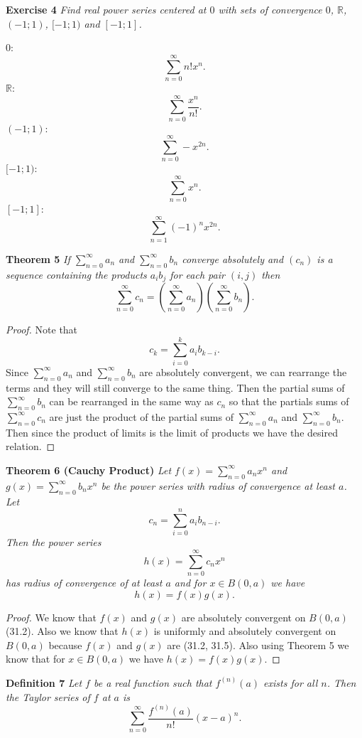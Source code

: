 \documentclass{article}
\begin{document}
\begin{flushleft}
\textbf{Exercise 4}
\textsl{Find real power series centered at $0$ with sets of convergence $0$, $\mathbb{R}$, $(-1;1)$, $[-1;1)$ and $[-1;1]$.}\newline

$0$:
\[
\sum_{n=0}^{\infty} n! x^n.
\]
$\mathbb{R}$:
\[
\sum_{n=0}^{\infty} \frac{x^n}{n!}.
\]
$(-1;1)$:
\[
\sum_{n=0}^{\infty} -x^{2n}.
\]
$[-1;1)$:
\[
\sum_{n=0}^{\infty} x^n.
\]
$[-1;1]$:
\[
\sum_{n=1}^{\infty} (-1)^n x^{2n}.
\]

\textbf{Theorem 5}
\textsl{If $\sum_{n=0}^{\infty} a_n$ and $\sum_{n=0}^{\infty} b_n$ converge absolutely and $(c_n)$ is a sequence containing the products $a_i b_j$ for each pair $(i,j)$ then
\[
\sum_{n=0}^{\infty} c_n = \left ( \sum_{n=0}^{\infty} a_n \right ) \left ( \sum_{n=0}^{\infty} b_n \right ).
\]}
\begin{proof}
Note that
\[
c_k = \sum_{i=0}^k a_i b_{k-i}.
\]
Since $\sum_{n=0}^{\infty} a_n$ and $\sum_{n=0}^{\infty} b_n$ are absolutely convergent, we can rearrange the terms and they will still converge to the same thing. Then the partial sums of $\sum_{n=0}^{\infty} b_n$ can be rearranged in the same way as $c_n$ so that the partials sums of $\sum_{n=0}^{\infty} c_n$ are just the product of the partial sums of $\sum_{n=0}^{\infty} a_n$ and $\sum_{n=0}^{\infty} b_n$. Then since the product of limits is the limit of products we have the desired relation.
\end{proof}

\textbf{Theorem 6 (Cauchy Product)}
\textsl{Let $f(x) = \sum_{n=0}^{\infty} a_n x^n$ and $g(x) = \sum_{n=0}^{\infty} b_n x^n$ be the power series with radius of convergence at least $a$. Let
\[
c_n = \sum_{i=0}^{n} a_i b_{n-i}.
\]
Then the power series
\[
h(x) = \sum_{n=0}^{\infty} c_n x^n
\]
has radius of convergence of at least $a$ and for $x \in B(0,a)$ we have
\[
h(x) = f(x) g(x).
\]}
\begin{proof}
We know that $f(x)$ and $g(x)$ are absolutely convergent on $B(0,a)$ (31.2). Also we know that $h(x)$ is uniformly and absolutely convergent on $B(0,a)$ because $f(x)$ and $g(x)$ are (31.2, 31.5). Also using Theorem 5 we know that for $x \in B(0,a)$ we have $h(x) = f(x)g(x)$.
\end{proof}

\textbf{Definition 7}
\textsl{Let $f$ be a real function such that $f^{(n)} (a)$ exists for all $n$. Then the Taylor series of $f$ at $a$ is
\[
\sum_{n=0}^{\infty} \frac{f^{(n)} (a)}{n!} (x-a)^n.
\]}


\end{flushleft}
\end{document}
